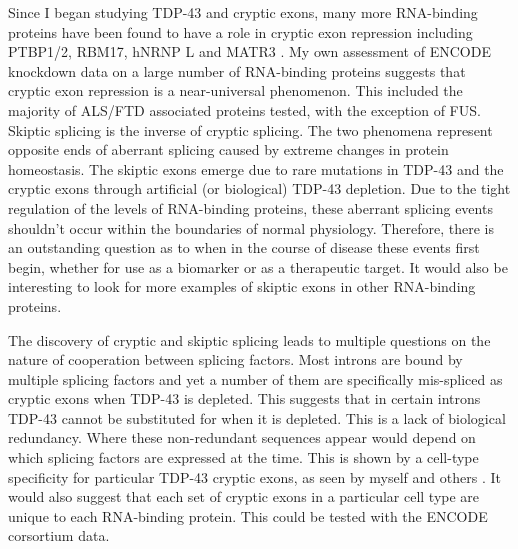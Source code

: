 Since I began studying TDP-43 and cryptic exons, many more RNA-binding proteins have been found to have a role in cryptic exon repression including PTBP1/2, RBM17, hNRNP L and MATR3 \citep{Ling2016,Tan2016,McClory2018,Attig2018}. 
My own assessment of ENCODE knockdown data on a large number of RNA-binding proteins suggests that cryptic exon repression is a near-universal phenomenon. 
This included the majority of ALS/FTD associated proteins tested, with the exception of FUS.
Skiptic splicing is the inverse of cryptic splicing. The two phenomena represent opposite ends of aberrant splicing caused by extreme changes in protein homeostasis. The skiptic exons emerge due to rare mutations in TDP-43 and the cryptic exons through artificial (or biological) TDP-43 depletion.  Due to the tight regulation of the levels of RNA-binding proteins, these aberrant splicing events shouldn't occur within the boundaries of normal physiology. Therefore, there is an outstanding question as to when in the course of disease these events first begin, whether for use as a biomarker or as a therapeutic target. 
It would also be interesting to look for more examples of skiptic exons in other RNA-binding proteins.




The discovery of cryptic and skiptic splicing leads to multiple questions on the nature of cooperation between splicing factors.
Most introns are bound by multiple splicing factors and yet a number of them are specifically mis-spliced as cryptic exons when TDP-43 is depleted.
This suggests that in certain introns TDP-43 cannot be substituted for when it is depleted. 
This is a lack of biological redundancy. 
Where these non-redundant sequences appear would depend on which splicing factors are expressed at the time.
This is shown by a cell-type specificity for particular TDP-43 cryptic exons, as seen by myself and others \citep{Jeong2017}. 
It would also suggest that each set of cryptic exons in a particular cell type are unique to each RNA-binding protein.
This could be tested with the ENCODE corsortium data.

